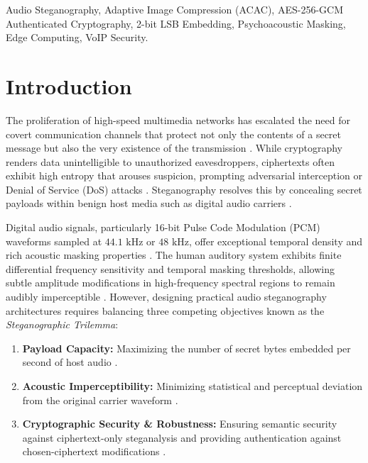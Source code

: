 \documentclass[10pt,conference]{IEEEtran}
\begin{document}
\begin{IEEEkeywords}
Audio Steganography, Adaptive Image Compression (ACAC), AES-256-GCM Authenticated Cryptography, 2-bit LSB Embedding, Psychoacoustic Masking, Edge Computing, VoIP Security.
\end{IEEEkeywords}

\section{Introduction}
The proliferation of high-speed multimedia networks has escalated the need for covert communication channels that protect not only the contents of a secret message but also the very existence of the transmission \cite{aslantas2022,patel2022,kumar2023,wu2023}. While cryptography renders data unintelligible to unauthorized eavesdroppers, ciphertexts often exhibit high entropy that arouses suspicion, prompting adversarial interception or Denial of Service (DoS) attacks \cite{gupta2023,tanaka2023}. Steganography resolves this by concealing secret payloads within benign host media such as digital audio carriers \cite{chen2023,martinez2023}.

Digital audio signals, particularly 16-bit Pulse Code Modulation (PCM) waveforms sampled at $44.1\text{ kHz}$ or $48\text{ kHz}$, offer exceptional temporal density and rich acoustic masking properties \cite{sharma2023,hassan2024}. The human auditory system exhibits finite differential frequency sensitivity and temporal masking thresholds, allowing subtle amplitude modifications in high-frequency spectral regions to remain audibly imperceptible \cite{ali2023,zhang2023,wang2024}. However, designing practical audio steganography architectures requires balancing three competing objectives known as the \textit{Steganographic Trilemma}:
\begin{enumerate}
    \item \textbf{Payload Capacity:} Maximizing the number of secret bytes embedded per second of host audio \cite{ohern2024,nair2024}.
    \item \textbf{Acoustic Imperceptibility:} Minimizing statistical and perceptual deviation from the original carrier waveform \cite{farouk2024}.
    \item \textbf{Cryptographic Security & Robustness:} Ensuring semantic security against ciphertext-only steganalysis and providing authentication against chosen-ciphertext modifications \cite{ibrahim2024,choi2024,hmood2024}.
\end{enumerate}
\end{document}
